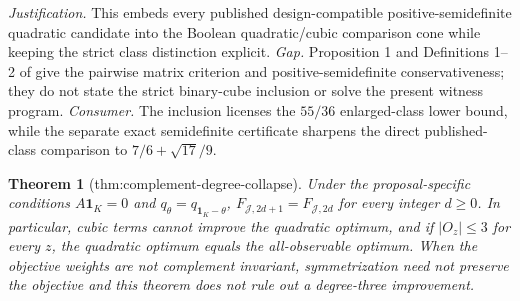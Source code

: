 \documentclass{article}
\newtheorem{theorem}{Theorem}
\begin{document}
\par\smallskip\noindent \textit{Justification.} This embeds every published design-compatible positive-semidefinite quadratic candidate into the Boolean quadratic/cubic comparison cone while keeping the strict class distinction explicit. \textit{Gap.} Proposition 1 and Definitions 1--2 of \cite{HarshawMiddletonSavje2026} give the pairwise matrix criterion and positive-semidefinite conservativeness; they do not state the strict binary-cube inclusion or solve the present witness program. \textit{Consumer.} The inclusion licenses the \(55/36\) enlarged-class lower bound, while the separate exact semidefinite certificate sharpens the direct published-class comparison to \(7/6+\sqrt{17}/9\).

\begin{theorem}[thm:complement-degree-collapse]\label{thm:complement-degree-collapse}
Under the proposal-specific conditions \(A\mathbf 1_K=0\) and \(q_\theta=q_{\mathbf 1_K-\theta}\), \(F_{\mathcal J,2d+1}=F_{\mathcal J,2d}\) for every integer \(d\ge0\). In particular, cubic terms cannot improve the quadratic optimum, and if \(|O_z|\le3\) for every \(z\), the quadratic optimum equals the all-observable optimum. When the objective weights are not complement invariant, symmetrization need not preserve the objective and this theorem does not rule out a degree-three improvement.
\end{theorem}
\end{document}
